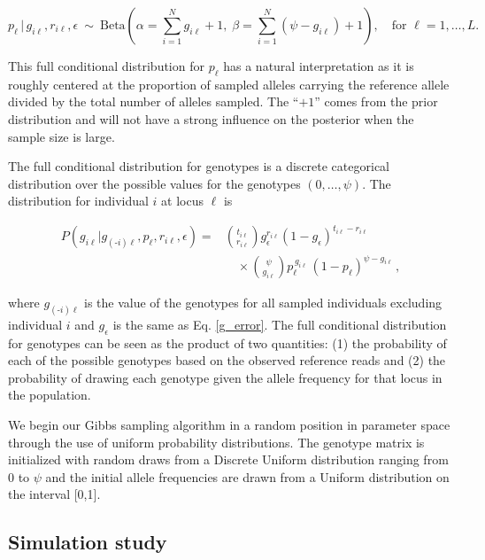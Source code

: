 \documentclass[11pt,english,letterpaper,oneside]{article}
\begin{document}
\begin{equation}\label{p-full}
p_{\ell}\,|\,g_{i \ell},r_{i \ell},\epsilon \: \sim \: \text{Beta}\left(\alpha= \sum_{i=1}^N g_{i \ell} +1,\; \beta = \sum_{i=1}^N (\psi-g_{i \ell})+1\right),\quad \text{for } \ell = 1,\ldots,L.
\end{equation}

\noindent This full conditional distribution for $p_{\ell}$ has a natural interpretation as it is roughly centered at the proportion of sampled alleles carrying the reference allele divided by the total number of alleles sampled. The ``$+1$'' comes from the prior distribution and will not have a strong influence on the posterior when the sample size is large.
\medskip

The full conditional distribution for genotypes is a discrete categorical distribution over the possible values for the genotypes $(0,\ldots,\psi)$. The distribution for individual $i$ at locus $\ell$ is

\begin{align}\label{G-full}
P(g_{i \ell}|g_{(\text{-}i) \ell},p_{\ell},r_{i \ell},\epsilon) =  &\binom{t_{i\ell}}{r_{i\ell}} g_\epsilon^{r_{i \ell}}(1-g_\epsilon)^{t_{i \ell}-r_{i \ell}} \nonumber \\[0.05in]
&\quad \times \binom{\psi}{g_{i \ell}}p_{\ell}^{\,g_{i \ell}}\,(1-p_{\ell})^{\psi-g_{i \ell}}\,,
\end{align}

\noindent where $g_{(\text{-}i) \ell}$ is the value of the genotypes for all sampled individuals excluding individual $i$ and $g_\epsilon$ is the same as Eq. \ref{g_error}. The full conditional distribution for genotypes can be seen as the product of two quantities: (1) the probability of each of the possible genotypes based on the observed  reference reads and (2) the probability of drawing each genotype given the allele frequency for that locus in the population.
\medskip  

We begin our Gibbs sampling algorithm in a random position in parameter space through the use of uniform probability distributions. The genotype matrix is initialized with random draws from a Discrete Uniform distribution ranging from $0$ to $\psi$ and the initial allele frequencies are drawn from a Uniform distribution on the interval [0,1].

\medskip
\subsection{Simulation study} %
\medskip
\end{document}
